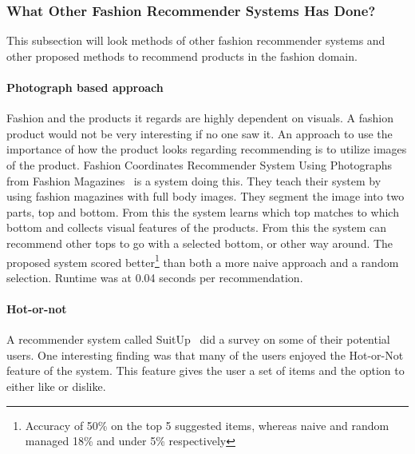 
\subsubsection{What Other Fashion Recommender Systems Has Done?}

This subsection will look methods of other fashion recommender systems and
other proposed methods to recommend products in the fashion domain.

\paragraph{Photograph based approach}
Fashion and the products it regards are highly dependent on visuals.  A fashion
product would not be very interesting if no one saw it.  An approach to use the
importance of how the product looks regarding recommending is to utilize images
of the product.  Fashion Coordinates Recommender System Using Photographs from
Fashion Magazines~\cite{Iwata:2011} is a system doing this.  They teach their
system by using fashion magazines with full body images.  They segment the
image into two parts, top and bottom.  From this the system learns which top
matches to which bottom and collects visual features of the products.  From
this the system can recommend other tops to go with a selected bottom, or other
way around.  The proposed system scored better\footnote{Accuracy of 50\% on the
top 5 suggested items, whereas naive and random managed 18\% and under 5\%
respectively} than both a more naive approach and a random selection.  Runtime
was at 0.04 seconds per recommendation.

\paragraph{Hot-or-not}
A recommender system called SuitUp~\cite{SuitUp} did a survey on some of their potential users.
One interesting finding was that many of the users enjoyed the Hot-or-Not feature of the system.
This feature gives the user a set of items and the option to either like or dislike.


